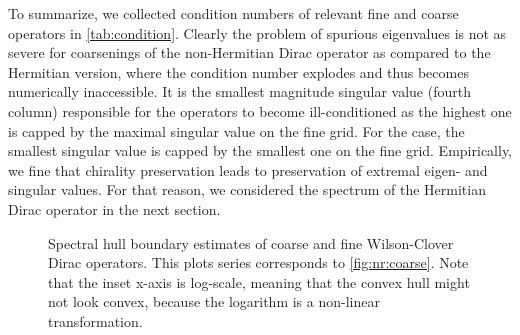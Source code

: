 To summarize, we collected condition numbers of relevant fine and coarse operators in \cref{tab:condition}.
Clearly the problem of spurious eigenvalues is not as severe for coarsenings of the non-Hermitian Dirac operator as compared to the Hermitian version, where the condition number explodes and thus becomes numerically inaccessible.
It is the smallest magnitude singular value (fourth column) responsible for the operators to become ill-conditioned as the highest one is capped by the maximal singular value on the fine grid.
For the  case, the smallest singular value is capped by the smallest one on the fine grid.
Empirically, we fine that chirality preservation leads to preservation of extremal eigen- and singular values.
For that reason, we considered the spectrum of the Hermitian Dirac operator in the next section.

\begin{figure}
\centering

\hfill
{}

\hfill
{}

\caption{
Spectral hull boundary estimates of coarse and fine Wilson-Clover Dirac operators.
This plots series corresponds to \cref{fig:nr:coarse}.
Note that the inset x-axis is log-scale, meaning that the convex hull might not look convex, because the logarithm is a non-linear transformation.
}
\label{fig:ch:coarse}
\end{figure}

